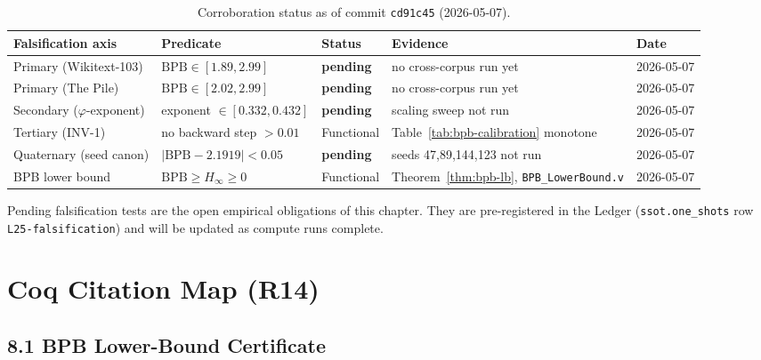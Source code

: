 \begin{table}[h]
\centering
\caption{Corroboration status as of commit \texttt{cd91c45} (2026-05-07).}
\label{tab:corroboration}
\begin{tabular}{lllll}
\toprule
Falsification axis & Predicate & Status & Evidence & Date\\
\midrule
Primary (Wikitext-103) & $\mathrm{BPB}\in[1.89,2.99]$ & \textbf{pending} & no cross-corpus run yet & 2026-05-07\\
Primary (The Pile)     & $\mathrm{BPB}\in[2.02,2.99]$ & \textbf{pending} & no cross-corpus run yet & 2026-05-07\\
Secondary ($\varphi$-exponent) & exponent $\in[0.332,0.432]$ & \textbf{pending} & scaling sweep not run & 2026-05-07\\
Tertiary (INV-1)       & no backward step $>0.01$ & Functional & Table~\ref{tab:bpb-calibration} monotone & 2026-05-07\\
Quaternary (seed canon) & $|\mathrm{BPB}-2.1919|<0.05$ & \textbf{pending} & seeds 47,89,144,123 not run & 2026-05-07\\
BPB lower bound        & $\mathrm{BPB}\ge H_\infty\ge 0$ & Functional & Theorem~\ref{thm:bpb-lb}, \texttt{BPB\_LowerBound.v} & 2026-05-07\\
\bottomrule
\end{tabular}
\end{table}

Pending falsification tests are the open empirical obligations of
this chapter.  They are pre-registered in the Ledger
(\texttt{ssot.one\_shots} row \texttt{L25-falsification}) and will
be updated as compute runs complete.

\section{Coq Citation Map (R14)}
\label{sec:ch25-coq-map}

\subsection{8.1 BPB Lower-Bound Certificate}
\label{subsec:ch25-coq-bpb-lb}

